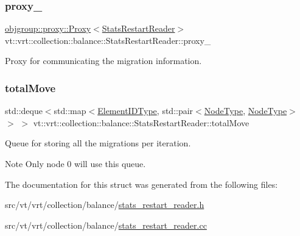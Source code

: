 \subsubsection{\texorpdfstring{proxy\+\_\+}{proxy\_}}
{\footnotesize\ttfamily \hyperlink{structvt_1_1objgroup_1_1proxy_1_1_proxy}{objgroup\+::proxy\+::\+Proxy}$<$\hyperlink{structvt_1_1vrt_1_1collection_1_1balance_1_1_stats_restart_reader}{Stats\+Restart\+Reader}$>$ vt\+::vrt\+::collection\+::balance\+::\+Stats\+Restart\+Reader\+::proxy\+\_\+\hspace{0.3cm}{\ttfamily [private]}}



Proxy for communicating the migration information. 

\mbox{\label{structvt_1_1vrt_1_1collection_1_1balance_1_1_stats_restart_reader_aabfc46df6681168e7f982c8b7ea5c778}} 
\subsubsection{\texorpdfstring{total\+Move}{totalMove}}
{\footnotesize\ttfamily std\+::deque$<$std\+::map$<$\hyperlink{namespacevt_1_1vrt_1_1collection_1_1balance_a14c8d2c972f2913aa3f1636e5be0a120}{Element\+I\+D\+Type}, std\+::pair$<$\hyperlink{namespacevt_a866da9d0efc19c0a1ce79e9e492f47e2}{Node\+Type}, \hyperlink{namespacevt_a866da9d0efc19c0a1ce79e9e492f47e2}{Node\+Type}$>$ $>$ $>$ vt\+::vrt\+::collection\+::balance\+::\+Stats\+Restart\+Reader\+::total\+Move\hspace{0.3cm}{\ttfamily [private]}}



Queue for storing all the migrations per iteration. 

\begin{DoxyNote}{Note}
Only node 0 will use this queue. 
\end{DoxyNote}


The documentation for this struct was generated from the following files\+:\begin{DoxyCompactItemize}
\item 
src/vt/vrt/collection/balance/\hyperlink{stats__restart__reader_8h}{stats\+\_\+restart\+\_\+reader.\+h}\item 
src/vt/vrt/collection/balance/\hyperlink{stats__restart__reader_8cc}{stats\+\_\+restart\+\_\+reader.\+cc}\end{DoxyCompactItemize}
